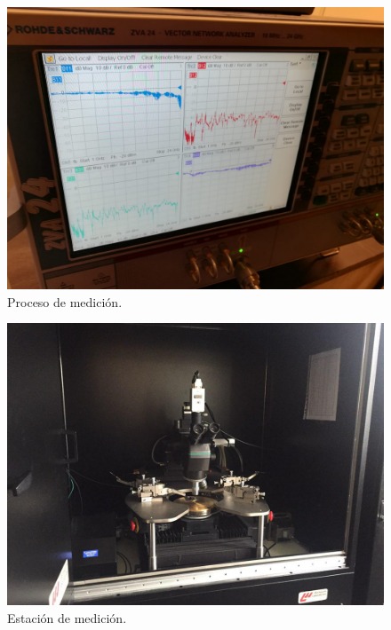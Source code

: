 \documentclass[10pt, a4paper, twocolumn]{article}
\begin{document}
\begin{figure}[hbt!]
	\includegraphics[width=\linewidth]{Fotos/Med_2.jpeg}
	\caption{Proceso de medición.}
\end{figure}

\begin{figure}[hbt!]
	\includegraphics[width=\linewidth]{Fotos/Med_3b.jpg}
	\caption{Estación de medición.}
\end{figure}
\end{document}
